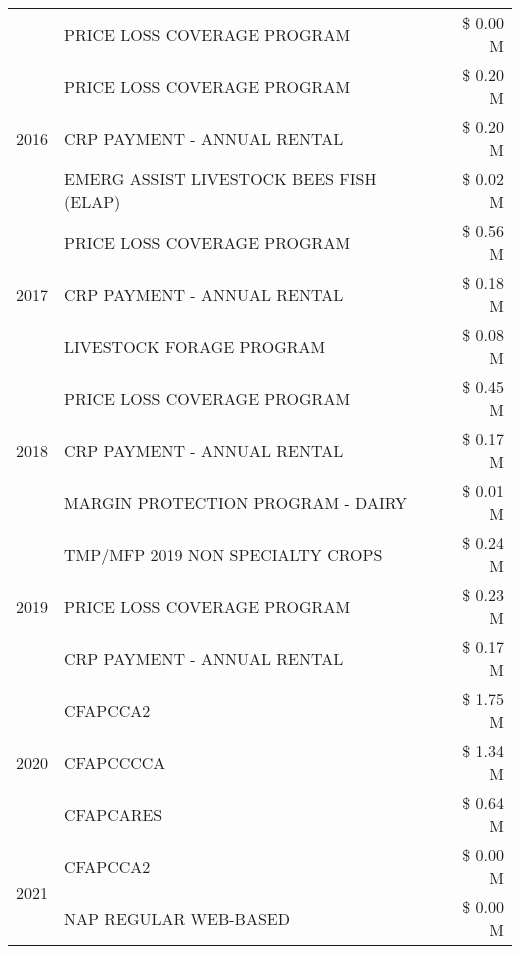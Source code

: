 \begin{tabular}{llr}
 & PRICE LOSS COVERAGE PROGRAM & \$ 0.00 M \\
\cline{1-3}
\multirow[t]{3}{*}{2016} & PRICE LOSS COVERAGE PROGRAM & \$ 0.20 M \\
 & CRP PAYMENT - ANNUAL RENTAL & \$ 0.20 M \\
 & EMERG ASSIST LIVESTOCK BEES FISH (ELAP) & \$ 0.02 M \\
\cline{1-3}
\multirow[t]{3}{*}{2017} & PRICE LOSS COVERAGE PROGRAM & \$ 0.56 M \\
 & CRP PAYMENT - ANNUAL RENTAL & \$ 0.18 M \\
 & LIVESTOCK FORAGE PROGRAM & \$ 0.08 M \\
\cline{1-3}
\multirow[t]{3}{*}{2018} & PRICE LOSS COVERAGE PROGRAM & \$ 0.45 M \\
 & CRP PAYMENT - ANNUAL RENTAL & \$ 0.17 M \\
 & MARGIN PROTECTION PROGRAM - DAIRY & \$ 0.01 M \\
\cline{1-3}
\multirow[t]{3}{*}{2019} & TMP/MFP 2019 NON SPECIALTY CROPS & \$ 0.24 M \\
 & PRICE LOSS COVERAGE PROGRAM & \$ 0.23 M \\
 & CRP PAYMENT - ANNUAL RENTAL & \$ 0.17 M \\
\cline{1-3}
\multirow[t]{3}{*}{2020} & CFAPCCA2 & \$ 1.75 M \\
 & CFAPCCCCA & \$ 1.34 M \\
 & CFAPCARES & \$ 0.64 M \\
\cline{1-3}
\multirow[t]{2}{*}{2021} & CFAPCCA2 & \$ 0.00 M \\
 & NAP REGULAR WEB-BASED & \$ 0.00 M \\
\cline{1-3}
\bottomrule
\end{tabular}
